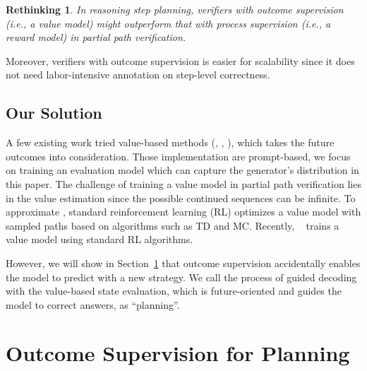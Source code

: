 \documentclass[11pt]{article}
\theoremstyle{plain}
\theoremstyle{claim}
\theoremstyle{rethinking}
\newtheorem{rethinking}{Rethinking}
\theoremstyle{researchquestion}
\theoremstyle{findings}
\theoremstyle{fact}
\theoremstyle{proper}
\theoremstyle{remark}
\begin{document}
\begin{rethinking}
In reasoning step planning,  verifiers with outcome supervision  (i.e., a value model) might outperform that with process supervision (i.e., a reward model)  in partial path verification. 
\end{rethinking}
Moreover, verifiers with outcome supervision is easier for scalability since it does not need labor-intensive  annotation on  step-level correctness.





\subsection{Our Solution}

A few existing  work tried value-based methods (\citealp{tot23}, \citealp{rap2023}, \citealp{alphazero-like23}), which takes the future outcomes into consideration. Those implementation are prompt-based, we focus on training an evaluation model which can capture the generator's distribution in this paper.
The challenge of training a value model in  partial path verification lies in the value estimation since the possible continued sequences  can be infinite. To approximate , standard reinforcement learning (RL) optimizes a value model with sampled paths based on algorithms such as TD and MC. Recently, ~\citet{alphazero-like23} trains a value model using standard RL algorithms. 



However, we will show in Section~\ref{sec:methodology} that outcome supervision accidentally enables the model to predict  with a new strategy.  
We call the process of guided decoding with the value-based state evaluation, which is future-oriented and guides the model to correct answers, as ``planning''. 





















\section{Outcome Supervision for Planning}
\label{sec:methodology}
\end{document}
